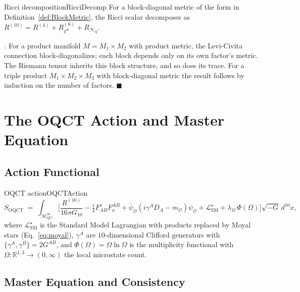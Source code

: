 \documentclass[11pt,a4paper]{article}
\theoremstyle{myrmk}
\renewenvironment{proof}[1][\proofname]{%
  \par\noindent\textit{#1.}\enspace\ignorespaces}{\hfill$\blacksquare$\par\medskip}
\newcommand{\Mmanifold}{\mathcal{M}^{10}_{\mathrm{QC}}}
\newcommand{\cC}{\mathcal{C}^{6}}
\newcommand{\HH}{\mathcal{H}_{\mathrm{Q}}}
\begin{document}
\begin{theorem}{Ricci decomposition}{RicciDecomp}
For a block-diagonal metric of the form in Definition~\ref{def:BlockMetric},
the Ricci scalar decomposes as
$R^{(10)} = R^{(4)} + R^{(6)}_{\cC} + R_{\HH}$.
\end{theorem}

\begin{proof}
For a product manifold $M=M_1\times M_2$ with product metric, the Levi-Civita
connection block-diagonalizes; each block depends only on its own factor's metric.
The Riemann tensor inherits this block structure, and so does its trace. For a triple
product $M_1\times M_2\times M_3$ with block-diagonal metric the result follows by
induction on the number of factors.
\end{proof}

\section{The OQCT Action and Master Equation}
\label{sec:action}

\subsection{Action Functional}

\begin{definition}{OQCT action}{OQCTAction}
\begin{equation}
  S_{\mathrm{OQCT}}\;=\;\int_{\Mmanifold}\!\!
    \biggl[\frac{R^{(10)}}{16\pi G_{10}}
    -\tfrac{1}{4}F^a_{AB}F^{AB}_a
    +\bar\psi_{\mathcal{O}}\!\left(i\gamma^A D_A-m_{\mathcal{O}}\right)\!\psi_{\mathcal{O}}
    +\mathcal{L}_{\mathrm{SM}}^\star
    +\lambda_\Omega\,\Phi(\Omega)\biggr]\!\sqrt{-G}\,d^{10}x,
  \label{eq:action}
\end{equation}
where $\mathcal{L}_{\mathrm{SM}}^\star$ is the Standard Model Lagrangian with products
replaced by Moyal stars (Eq.~\eqref{eq:moyal}), $\gamma^A$ are $10$-dimensional
Clifford generators with $\{\gamma^A,\gamma^B\}=2G^{AB}$, and
$\Phi(\Omega)=\Omega\ln\Omega$ is the multiplicity functional with
$\Omega:\mathbb{R}^{1,3}\to(0,\infty)$ the local microstate count.
\end{definition}

\subsection{Master Equation and Consistency}
\end{document}
